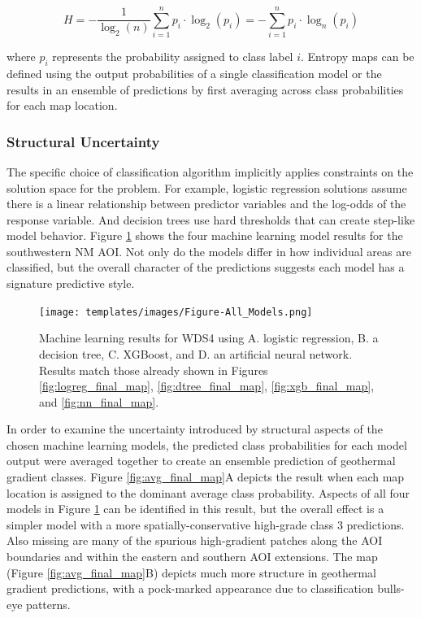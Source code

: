 \begin{equation}
\label{eq:norm_entropy}
    H = -\frac{1}{\log_2{(n)}}\sum_{i=1}^{n}{p_i \cdot \log_2{(p_i)}} = -\sum_{i=1}^{n}{p_i \cdot \log_n{(p_i)}}
\end{equation}

where $p_i$ represents the probability assigned to class label $i$. Entropy maps can be defined using the output probabilities of a single classification model or the results in an ensemble of predictions by first averaging across class probabilities for each map location.

\subsubsection{Structural Uncertainty}
\label{ch5:model_uncertainty}

The specific choice of classification algorithm implicitly applies constraints on the solution space for the problem. For example, logistic regression solutions assume there is a linear relationship between predictor variables and the log-odds of the response variable. And decision trees use hard thresholds that can create step-like model behavior. Figure \ref{fig:combined_maps} shows the four machine learning model results for the southwestern NM AOI. Not only do the models differ in how individual areas are classified, but the overall character of the predictions suggests each model has a signature predictive style.

\begin{figure}[!htp]
\centering
\texttt{[image: templates/images/Figure-All\_Models.png]}
\caption[Combined machine learning results]{Machine learning results for WDS4 using A. logistic regression, B. a decision tree, C. XGBoost, and D. an artificial neural network. Results match those already shown in Figures \ref{fig:logreg_final_map}, \ref{fig:dtree_final_map}, \ref{fig:xgb_final_map}, and \ref{fig:nn_final_map}.}
\label{fig:combined_maps}
\end{figure}

In order to examine the uncertainty introduced by structural aspects of the chosen machine learning models, the predicted class probabilities for each model output were averaged together to create an ensemble prediction of geothermal gradient classes. Figure \ref{fig:avg_final_map}A depicts the result when each map location is assigned to the dominant average class probability. Aspects of all four models in Figure \ref{fig:combined_maps} can be identified in this result, but the overall effect is a simpler model with a more spatially-conservative high-grade class 3 predictions. Also missing are many of the spurious high-gradient patches along the AOI boundaries and within the eastern and southern AOI extensions. The \citeauthor{bielicki_hydrogeolgic_2015} map (Figure \ref{fig:avg_final_map}B) depicts much more structure in geothermal gradient predictions, with a pock-marked appearance due to classification bulls-eye patterns.

